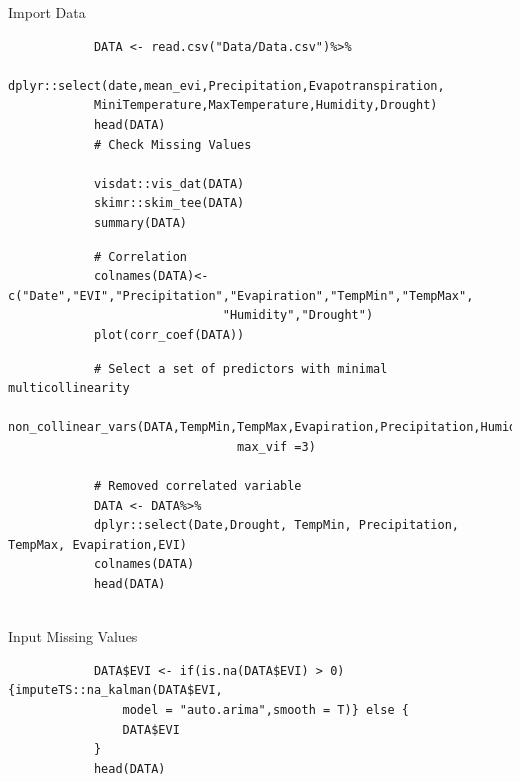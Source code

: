 \documentclass[12pt,a4paper]{book}
\begin{document}
			Import Data
				\begin{verbatim}
			DATA <- read.csv("Data/Data.csv")%>%
			dplyr::select(date,mean_evi,Precipitation,Evapotranspiration,
			MiniTemperature,MaxTemperature,Humidity,Drought)
			head(DATA)
			# Check Missing Values
			
			visdat::vis_dat(DATA)
			skimr::skim_tee(DATA)
			summary(DATA)
				\end{verbatim}
	
				\begin{verbatim}
			# Correlation			
			colnames(DATA)<- c("Date","EVI","Precipitation","Evapiration","TempMin","TempMax",
			                  "Humidity","Drought")
			plot(corr_coef(DATA))
				\end{verbatim}
	
				\begin{verbatim}
			# Select a set of predictors with minimal multicollinearity			
			non_collinear_vars(DATA,TempMin,TempMax,Evapiration,Precipitation,Humidity,Drought,
			                    max_vif =3)
			
			# Removed correlated variable			
			DATA <- DATA%>%
			dplyr::select(Date,Drought, TempMin, Precipitation, TempMax, Evapiration,EVI)			
			colnames(DATA)
			head(DATA)
			
				\end{verbatim}
	Input Missing Values 
				\begin{verbatim}
			DATA$EVI <- if(is.na(DATA$EVI) > 0){imputeTS::na_kalman(DATA$EVI, 
				model = "auto.arima",smooth = T)} else {
				DATA$EVI
			}
			head(DATA)
		 	
				\end{verbatim}
	
\end{document}
